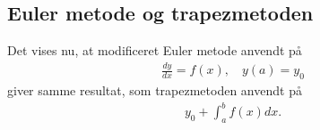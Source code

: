%
\subsection*{Euler metode og trapezmetoden}
%
Det vises nu, at modificeret Euler metode anvendt på
\begin{align*}
\frac{dy}{dx}=f(x),\phantom{hi}y(a)=y_0
\end{align*}
%
giver samme resultat, som trapezmetoden anvendt på
%
\begin{align*}
y_0 + \int_a^b f(x) dx.
\end{align*}
%